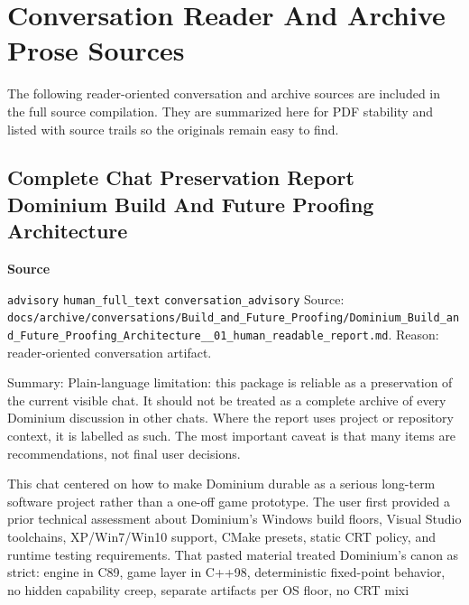 \documentclass[9pt,a4paper,openany]{book}
\newcommand{\vonecallout}[3]{\par\medskip\noindent\begingroup\setlength{\fboxsep}{7pt}\colorbox{DomCalloutBg}{\parbox{0.94\linewidth}{\textbf{\textcolor{#1}{#2}}\par #3}}\endgroup\par\medskip}
\begin{document}
\section{Conversation Reader And Archive Prose Sources}


The following reader-\allowbreak{}oriented conversation and archive sources are included in the full source compilation.\allowbreak{} They are summarized here for PDF stability and listed with source trails so the originals remain easy to find.\allowbreak{}



\subsection{Complete Chat Preservation Report Dominium Build And Future Proofing Architecture}

\vonecallout{DomSlate}{Source}{\texttt{advisory} \texttt{human\_\allowbreak{}full\_\allowbreak{}text} \texttt{conversation\_\allowbreak{}advisory} Source: \texttt{docs/\allowbreak{}archive/\allowbreak{}conversations/\allowbreak{}Build\_\allowbreak{}and\_\allowbreak{}Future\_\allowbreak{}Proofing/\allowbreak{}Dominium\_\allowbreak{}Build\_\allowbreak{}and\_\allowbreak{}Future\_\allowbreak{}Proofing\_\allowbreak{}Architecture\_\allowbreak{}\_\allowbreak{}01\_\allowbreak{}human\_\allowbreak{}readable\_\allowbreak{}report.\allowbreak{}md}.\allowbreak{} Reason: reader-\allowbreak{}oriented conversation artifact.\allowbreak{}}

Summary: Plain-\allowbreak{}language limitation: this package is reliable as a preservation of the current visible chat.\allowbreak{} It should not be treated as a complete archive of every Dominium discussion in other chats.\allowbreak{} Where the report uses project or repository context, it is labelled as such.\allowbreak{} The most important caveat is that many items are recommendations, not final user decisions.\allowbreak{}


This chat centered on how to make Dominium durable as a serious long-\allowbreak{}term software project rather than a one-\allowbreak{}off game prototype.\allowbreak{} The user first provided a prior technical assessment about Dominium's Windows build floors, Visual Studio toolchains, XP/\allowbreak{}Win7/\allowbreak{}Win10 support, CMake presets, static CRT policy, and runtime testing requirements.\allowbreak{} That pasted material treated Dominium's canon as strict: engine in C89, game layer in C++98, deterministic fixed-\allowbreak{}point behavior, no hidden capability creep, separate artifacts per OS floor, no CRT mixi
\end{document}
